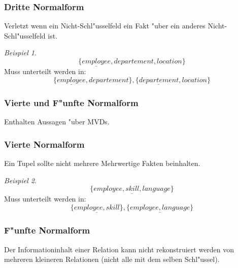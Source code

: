 \documentclass[german, 10pt, a4paper, twocolumn]{scrartcl}
\theoremstyle{definition}
\theoremstyle{remark}
\theoremstyle{example}
\newtheorem{example}{Beispiel}[subsection]
\begin{document}
\subsubsection{Dritte Normalform}

Verletzt wenn ein Nicht-Schl"usselfeld ein Fakt "uber ein anderes Nicht-Schl"usselfeld ist.\\

\begin{example} \
	\begin{displaymath}
		\{ \underline{employee}, departement, location \}
	\end{displaymath}
	Muss unterteilt werden in:
	\begin{displaymath}
		\{ \underline{employee}, departement\},\{ \underline{departement}, location \}
	\end{displaymath}
\end{example}


\subsubsection{Vierte und F"unfte Normalform}

Enthalten Aussagen "uber MVDs.


\subsubsection{Vierte Normalform}

Ein Tupel sollte nicht mehrere Mehrwertige Fakten beinhalten.\\

\begin{example} \
	\begin{displaymath}
		\{ \underline{employee, skill, language} \}
	\end{displaymath}
	Muss unterteilt werden in:
	\begin{displaymath}
		\{ \underline{employee, skill} \}, \{\underline{employee, language} \}
	\end{displaymath}
\end{example}


\subsubsection{F"unfte Normalform}

Der Informationinhalt einer Relation kann nicht rekonstruiert werden von mehreren kleineren Relationen (nicht alle mit dem selben Schl"ussel).\\
\end{document}
